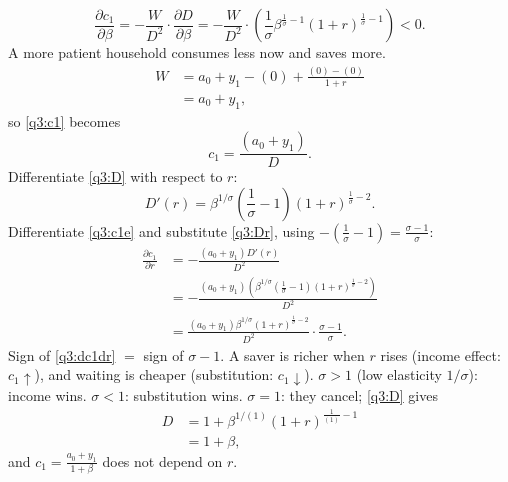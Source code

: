 \begin{sol}
\[
\frac{\partial c_1}{\partial\beta}=-\frac{W}{D^2}\cdot\frac{\partial D}{\partial\beta}
=-\frac{W}{D^2}\cdot\left(\frac1\sigma\beta^{\frac1\sigma-1}(1+r)^{\frac1\sigma-1}\right)<0 .
\]
A more patient household consumes less now and saves more.
\begin{align*}
W &= a_0+y_1-(0)+\frac{(0)-(0)}{1+r}\\
&= a_0+y_1,
\end{align*}
so \eqref{q3:c1} becomes
\begin{equation}
c_1=\frac{(a_0+y_1)}D. \label{q3:c1e}
\end{equation}
Differentiate \eqref{q3:D} with respect to $r$:
\begin{equation}
D'(r)=\beta^{1/\sigma}\left(\frac1\sigma-1\right)(1+r)^{\frac1\sigma-2}. \label{q3:Dr}
\end{equation}
Differentiate \eqref{q3:c1e} and substitute \eqref{q3:Dr}, using $-\left(\frac1\sigma-1\right)=\frac{\sigma-1}{\sigma}$:
\begin{align}
\frac{\partial c_1}{\partial r} &= -\frac{(a_0+y_1)D'(r)}{D^2}\nonumber\\
&= -\frac{(a_0+y_1)\left(\beta^{1/\sigma}\left(\frac1\sigma-1\right)(1+r)^{\frac1\sigma-2}\right)}{D^2}\nonumber\\
&= \frac{(a_0+y_1)\beta^{1/\sigma}(1+r)^{\frac1\sigma-2}}{D^2}\cdot\frac{\sigma-1}{\sigma}. \label{q3:dc1dr}
\end{align}
Sign of \eqref{q3:dc1dr} $=$ sign of $\sigma-1$. A saver is richer when $r$ rises (income effect: $c_1\uparrow$), and waiting is cheaper
(substitution: $c_1\downarrow$). $\sigma>1$ (low elasticity $1/\sigma$): income wins. $\sigma<1$: substitution wins. $\sigma=1$: they
cancel; \eqref{q3:D} gives
\begin{align*}
D &= 1+\beta^{1/(1)}(1+r)^{\frac1{(1)}-1}\\
&= 1+\beta,
\end{align*}
and $c_1=\frac{a_0+y_1}{1+\beta}$ does not depend on $r$.
\end{sol}

